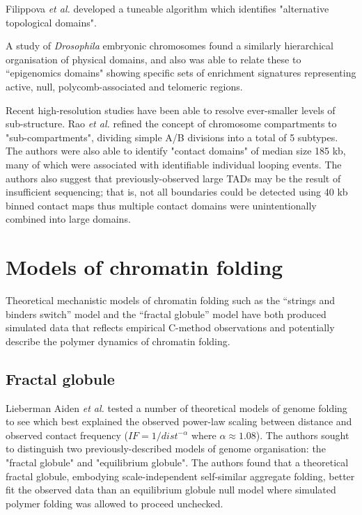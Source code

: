 \documentclass[a4paper,10pt,oneside]{book}
\begin{document}
Filippova \emph{et al.}\cite{Filippova2014} developed a tuneable algorithm which identifies "alternative topological domains".

A study of \emph{Drosophila} embryonic chromosomes found a similarly hierarchical organisation of physical domains, and also was able to relate these to ``epigenomics domains" showing specific sets of enrichment signatures representing active, null, polycomb-associated and telomeric regions.\cite{Sexton2012} 

Recent high-resolution studies have been able to resolve ever-smaller levels of sub-structure. Rao \emph{et al.}\cite{Rao2014} refined the concept of chromosome compartments to "sub-compartments", dividing simple A/B divisions into a total of 5 subtypes. The authors were also able to identify "contact domains" of median size 185 kb, many of which were associated with identifiable individual looping events.\cite{Rao2014} The authors also suggest that previously-observed large TADs may be the result of insufficient sequencing; that is, not all boundaries could be detected using 40 kb binned contact maps thus multiple contact domains were unintentionally combined into large domains.

\section{Models of chromatin folding}

Theoretical mechanistic models of chromatin folding such as the
``strings and binders switch'' model\cite{Barbieri2012} and the ``fractal
globule'' model\cite{Lieberman2009, Mirny2011, Grosberg1988a} have both produced simulated data
that reflects empirical C-method observations and potentially describe the polymer
dynamics of chromatin folding.

\subsection{Fractal globule}
Lieberman Aiden \emph{ et al.}\cite{Lieberman2009} tested a number of theoretical models of genome folding to see which best explained the observed power-law scaling between distance and observed contact frequency ($IF =  1 / dist^{-\alpha}$ where $\alpha \approx 1.08$).  The authors sought to distinguish two previously-described models of genome organisation: the "fractal globule" and "equilibrium globule". The authors found that a theoretical fractal globule, embodying scale-independent self-similar aggregate folding, better fit the observed data than an equilibrium globule null model where simulated polymer folding was allowed to proceed unchecked.
\end{document}
